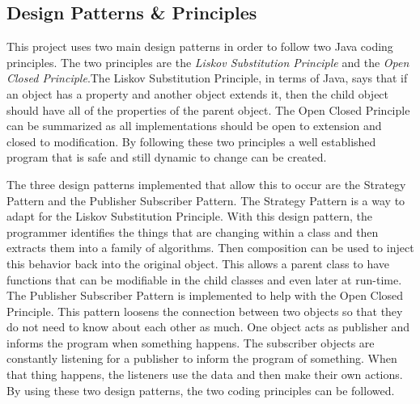 \documentclass{article}
\begin{document}
\subsection{Design Patterns \& Principles}
	This project uses two main design patterns in order to follow two Java coding principles. The two principles are the \textit{Liskov Substitution Principle} and the \textit{Open Closed Principle}.The Liskov Substitution Principle, in terms of Java, says that if an object has a property and another object extends it, then the child object should have all of the properties of the parent object. The Open Closed Principle can be summarized as all implementations should be open to extension and closed to modification. By following these two principles a well established program that is safe and still dynamic to change can be created. \par
	The three design patterns implemented that allow this to occur are the Strategy Pattern and the Publisher Subscriber Pattern. The Strategy Pattern is a way to adapt for the Liskov Substitution Principle. With this design pattern, the programmer identifies the things that are changing within a class and then extracts them into a family of algorithms. Then composition can be used to inject this behavior back into the original object. This allows a parent class to have functions that can be modifiable in the child classes and even later at run-time. The Publisher Subscriber Pattern is implemented to help with the Open Closed Principle. This pattern loosens the connection between two objects so that they do not need to know about each other as much. One object acts as publisher and informs the program when something happens. The subscriber objects are constantly listening for a publisher to inform the program of something. When that thing happens, the listeners use the data and then make their own actions. By using these two design patterns, the two coding principles can be followed.  
\end{document}
